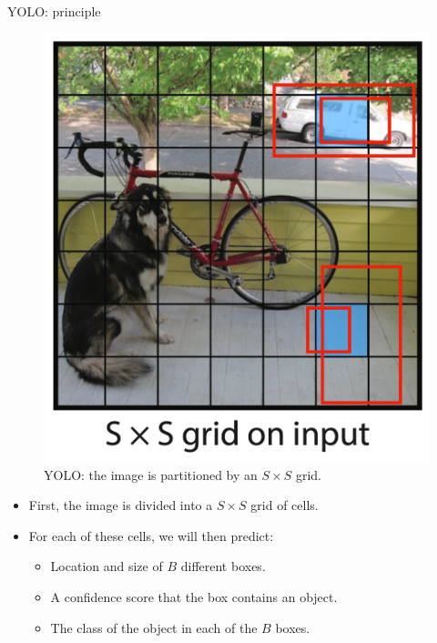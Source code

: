 \documentclass[xcolor=pdftex,dvipsnames,table]{beamer}
\begin{document}
\begin{frame}{YOLO: principle}
\begin{figure}[htb]
   \centering
   \includegraphics[height=0.4\textheight]{../graphics/YOLO_2.pdf}
   \caption{YOLO: the image is partitioned by an $S \times S$ grid.}
\end{figure}
\begin{itemize}
   \item First, the image is divided into a $S \times S$ grid of cells. 
   \item For each of these cells, we will then predict:
   \begin{itemize}
      \item Location and size of $B$ different boxes. 
      \item A confidence score that the box contains an object. 
      \item The class of the object in each of the $B$ boxes. 
   \end{itemize}
\end{itemize}
\end{frame}
\end{document}
